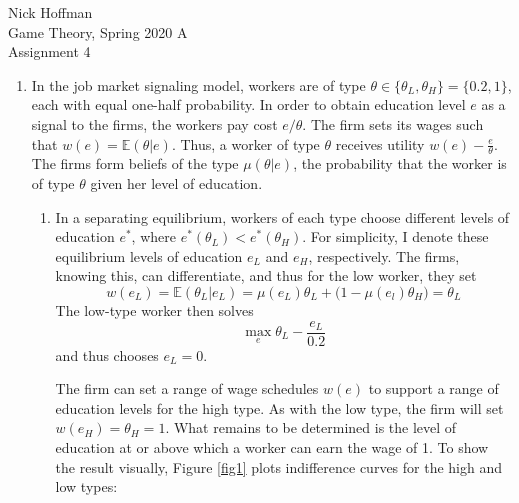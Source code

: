 \documentclass[11pt]{article}
\newcommand{\ev}{\mathbb{E}}
\begin{document}
\begin{flushleft}
	Nick Hoffman \\
	Game Theory, Spring 2020 A \\
	Assignment 4 \\
\end{flushleft}

\begin{enumerate}
	\item In the job market signaling model, workers are of type $ \theta\in\{\theta_L, \theta_H\} = \{0.2, 1\} $, each with equal one-half probability. In order to obtain education level $ e $ as a signal to the firms, the workers pay cost $ e/\theta $. The firm sets its wages such that $ w(e) = \ev(\theta|e) $. Thus, a worker of type $\theta$ receives utility $ w(e) - \frac{e}{\theta} $. The firms form beliefs of the type $ \mu(\theta|e) $, the probability that the worker is of type $\theta$ given her level of education. 
	\begin{enumerate}
		\item In a separating equilibrium, workers of each type choose different levels of education $ e^* $, where $ e^*(\theta_L) < e^*(\theta_H) $. For simplicity, I denote these equilibrium levels of education $ e_L $ and $ e_H $, respectively. The firms, knowing this, can differentiate, and thus for the low worker, they set
		\[w(e_L) = \ev(\theta_L|e_L) = \mu(e_L)\theta_L + \big(1 - \mu(e_l)\theta_H\big) = \theta_L\]
		The low-type worker then solves
		\[\max_e \theta_L - \frac{e_L}{0.2}\] 
		and thus chooses $ e_L = 0 $. 
		
		The firm can set a range of wage schedules $ w(e) $ to support a range of education levels for the high type. As with the low type, the firm will set $ w(e_H) = \theta_H = 1 $. What remains to be determined is the level of education at or above which a worker can earn the wage of 1. To show the result visually, Figure \ref{fig1} plots indifference curves for the high and low types:
		

\end{enumerate}
\end{enumerate}
\end{document}
